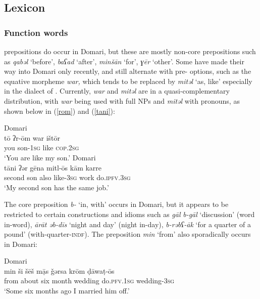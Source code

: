 \documentclass[output=paper]{langsci/langscibook}
\begin{document}
 \subsection{Lexicon}
 \subsubsection{Function words}

 {prepositions} do occur in Domari, but these are mostly non-core {prepositions} such as \textit{qabəl} ‘before’, \textit{baʕad} ‘after’, \textit{minšān} ‘for’, \textit{ɣēr} ‘other’. Some have made their way into Domari only recently, and still alternate with pre- options, such as the  equative morpheme \textit{war,} which tends to be replaced by  \textit{mitəl} ‘as, like’ especially in the dialect of . Currently, \textit{war} and \textit{mitəl} are in a quasi-complementary distribution, with \textit{war} being used with full NPs and \textit{mitəl} with pronouns, as shown below in (\ref{rom}) and (\ref{tani}):

\ea
{ Domari}\\ \label{rom}
\gll tō ʔr-ōm war ištōr\\
     you son-\textsc{1sg} like \textsc{cop.2sg}\\
\glt ‘You are like my son.’
\ex \label{tani}
{ Domari}\\
\gll tāni ʔər gēna mitl-ōs kām karre\\
     second son also like-\textsc{3sg} work do.\textsc{ipfv.3sg}\\
\glt ‘My second son has the same job.’
\z

The  core {preposition} \textit{b-} ‘in, with’ occurs in Domari, but it appears to be restricted to certain constructions and {idioms} such as \textit{gāl} \textit{b-gāl} ‘discussion’ (word in-word), \textit{ārāt} \textit{əb-dīs} ‘night and day’ (night in-day), \textit{b-rəbʕ-āk} ‘for a quarter of a pound’ (with-quarter-\textsc{indf}). The {preposition} \textit{min} ‘from’ also sporadically occurs in  Domari:

\ea
{ Domari}\\
\gll min ši šēš mạ̄s ǧərsa krōm ḍāwaṭ-ōs\\
     from about six month wedding do.\textsc{pfv.1sg} wedding-\textsc{3sg}\\
\glt ‘Some six months ago I married him off.’
\z
 
\end{document}
